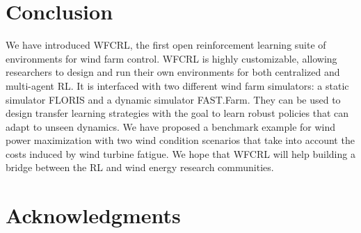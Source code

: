 \documentclass{article}
\newcommand{\md}[1]{{\color{red}#1}}
\begin{document}
\section{Conclusion}\label{sec:conclusion}
%
We have introduced WFCRL, the first open reinforcement learning suite of environments for wind farm control. WFCRL is highly customizable, allowing researchers to design and run their own environments for both centralized and multi-agent RL. It is interfaced with two different wind farm simulators: a static simulator FLORIS and a dynamic simulator FAST.Farm. They can be used to design transfer learning strategies with the goal to learn robust policies that can adapt to unseen dynamics. We have proposed a benchmark example for wind power maximization with two wind condition scenarios that take into account the costs induced by wind turbine fatigue. We hope that WFCRL will help building a bridge between the RL and wind energy research communities.
%
\newpage

\section{Acknowledgments}
\end{document}
